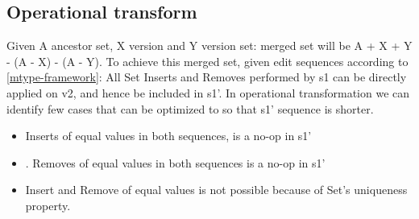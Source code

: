 \documentclass{article}
\begin{document}
\subsection{Operational transform}
Given A ancestor set, X version and Y version set: merged set will be A + X + Y - (A - X) - (A - Y).
To achieve this merged set, given edit sequences according to \ref{mtype-framework}: 
All Set Inserts and Removes performed by s1 can be directly applied on v2, and hence be included in s1'. In operational transformation we can identify few cases that can be optimized to so that s1' sequence is shorter.
\begin{itemize}
\item Inserts of equal values in both sequences, is a no-op in s1'
\item. Removes of equal values in both sequences is a no-op in s1'
\item Insert and Remove of equal values is not possible because of Set's uniqueness property.
\end{itemize}
\end{document}
